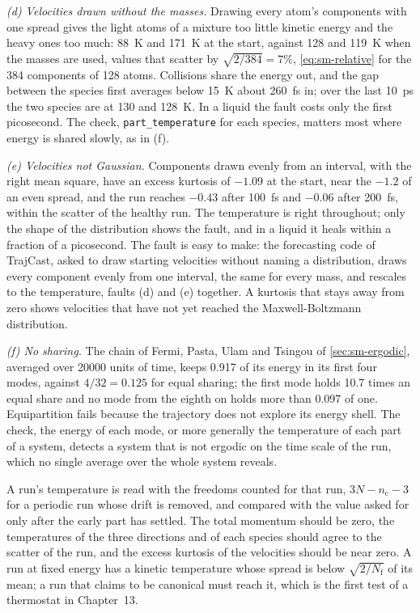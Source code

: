 \emph{(d) Velocities drawn without the masses.} Drawing every atom's
components with one spread gives the light atoms of a mixture too little
kinetic energy and the heavy ones too much: \SI{88}{\kelvin} and
\SI{171}{\kelvin} at the start, against 128 and \SI{119}{\kelvin} when
the masses are used, values that scatter by $\sqrt{2/384} = 7\%$,
\cref{eq:sm-relative} for the 384 components of 128 atoms. Collisions share the energy out, and the gap between the
species first averages below \SI{15}{\kelvin} about \SI{260}{\femto\second}
in; over the last \SI{10}{\pico\second} the two species are at 130 and
\SI{128}{\kelvin}. In a liquid the fault costs only the first
picosecond. The check, \texttt{part\_temperature} for each species,
matters most where energy is shared slowly, as in (f).

\emph{(e) Velocities not Gaussian.} Components drawn evenly from an
interval, with the right mean square, have an excess kurtosis of $-1.09$ at
the start, near the $-1.2$ of an even spread, and the run reaches $-0.43$
after \SI{100}{\femto\second} and $-0.06$ after \SI{200}{\femto\second},
within the scatter of the healthy run. The temperature is right
throughout; only the shape of the distribution shows the fault, and in a
liquid it heals within a fraction of a picosecond. The fault is easy to
make: the forecasting code of TrajCast\cite{Thiemann2026}, asked to draw
starting velocities without naming a distribution, draws every component
evenly from one interval, the same for every mass, and rescales to the
temperature, faults (d) and (e) together. A kurtosis that stays away from
zero shows velocities that have not yet reached the Maxwell-Boltzmann
distribution.

\emph{(f) No sharing.} The chain of Fermi, Pasta, Ulam and Tsingou of
\cref{sec:sm-ergodic}, averaged over \num{20000} units of time, keeps 0.917
of its energy in its first four modes, against $4/32 = 0.125$ for equal
sharing; the first mode holds 10.7 times an equal share and no mode from
the eighth on holds more than 0.097 of one. Equipartition fails because
the trajectory does not explore its energy shell. The check, the energy of
each mode, or more generally the temperature of each part of a system,
detects a system that is not ergodic on the time scale of the run, which
no single average over the whole system reveals.

\begin{practice}
A run's temperature is read with the freedoms counted for that run, $3N -
n_{\mathrm c} - 3$ for a periodic run whose drift is removed, and compared
with the value asked for only after the early part has settled. The total
momentum should be zero, the temperatures of the three directions and of
each species should agree to the scatter of the run, and the excess
kurtosis of the velocities should be near zero. A run at
fixed energy has a kinetic temperature whose spread is below
$\sqrt{2/N_{\mathrm f}}$ of its mean; a run that claims to be canonical
must reach it, which is the first test of a thermostat in Chapter~13.
\end{practice}

